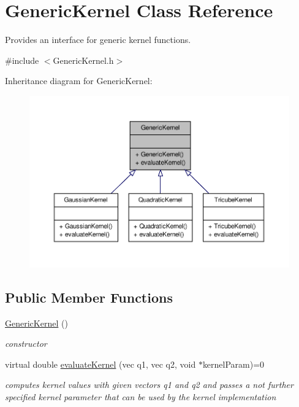 \hypertarget{classGenericKernel}{\section{\-Generic\-Kernel \-Class \-Reference}
\label{classGenericKernel}
}


\-Provides an interface for generic kernel functions.  




{\ttfamily \#include $<$\-Generic\-Kernel.\-h$>$}



\-Inheritance diagram for \-Generic\-Kernel\-:\nopagebreak
\begin{figure}[H]
\begin{center}
\leavevmode
\includegraphics[width=350pt]{classGenericKernel__inherit__graph}
\end{center}
\end{figure}
\subsection*{\-Public \-Member \-Functions}
\begin{DoxyCompactItemize}
\item 
\hyperlink{classGenericKernel_abcaf5c25a540c85304912e5cf7087903}{\-Generic\-Kernel} ()
\begin{DoxyCompactList}\small\item\em constructor \end{DoxyCompactList}\item 
virtual double \hyperlink{classGenericKernel_a5b3ef309f47d56cfcb12d02bf0f0b5c7}{evaluate\-Kernel} (vec q1, vec q2, void $\ast$kernel\-Param)=0
\begin{DoxyCompactList}\small\item\em computes kernel values with given vectors q1 and q2 and passes a not further specified kernel parameter that can be used by the kernel implementation \end{DoxyCompactList}\end{DoxyCompactItemize}


